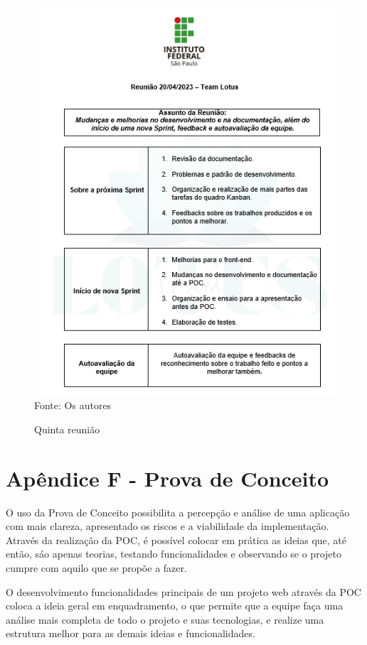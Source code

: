 \documentclass[12pt,a4paper]{article}
\begin{document}
\begin{figure}[H]
    \centering
    \caption{Quinta reunião}
     \includegraphics[width=15cm]{ilus5.png}
     Fonte: Os autores
     \label{ata}
\end{figure}

\newpage

\section{Apêndice F - Prova de Conceito}
O uso da Prova de Conceito possibilita a percepção e análise de uma aplicação com mais clareza, apresentado os riscos e a viabilidade da implementação. Através da realização da \ac{POC}, é possível colocar em prática as ideias que, até então, sáo apenas teorias, testando funcionalidades e observando se o projeto cumpre com aquilo que se propõe a fazer. 

O desenvolvimento funcionalidades principais de um projeto web através da \ac{POC} coloca a ideia geral em enquadramento, o que permite que a equipe faça uma análise mais completa de todo o projeto e suas tecnologias, e realize uma estrutura melhor para as demais ideias e funcionalidades. 
\end{document}

